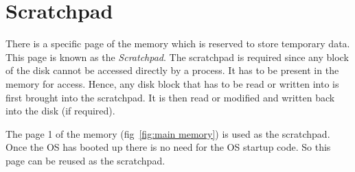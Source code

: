 \documentclass[10pt]{report}
\begin{document}
\section{Scratchpad}
There is a specific page of the memory which is reserved to store temporary data. This page is known as the \textit{Scratchpad}. The scratchpad is required since any block of the disk cannot be accessed directly  by a process. It has to be present in the memory for access. Hence, any disk block that has to be read or written into is first brought into the scratchpad. It is then read or modified and written back into the disk (if required).

The page 1 of the memory (fig~\ref{fig:main memory}) is used as the scratchpad. Once the OS has booted up there is no need for the OS startup code. So this page can be reused as the scratchpad.
\end{document}
